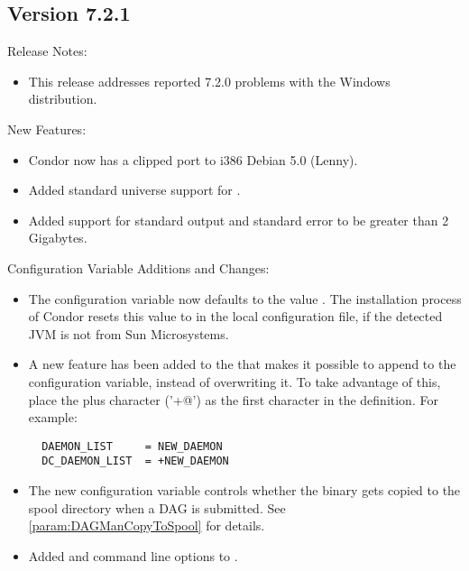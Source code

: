 \subsection*{\label{sec:New-7-2-1}Version 7.2.1}

\noindent Release Notes:

\begin{itemize}

\item This release addresses reported 7.2.0 problems with the
Windows distribution.

\end{itemize}


\noindent New Features:

\begin{itemize}

\item Condor now has a clipped port to i386 Debian 5.0 (Lenny).

\item Added standard universe support for .

\item Added support for standard output and standard error to be greater
than 2 Gigabytes.

\end{itemize}

\noindent Configuration Variable Additions and Changes:

\begin{itemize}

\item The configuration variable  now
defaults to the value .  The installation process of
Condor resets this value to  in the local
configuration file, if the detected JVM is not from Sun Microsystems.

\item A new feature has been added to the  that makes
it possible to append to the  configuration
variable, instead of overwriting it.  To take advantage of this, place
the plus character ('\verb@+@') as the first character in the
 definition.  For example:
\begin{verbatim}
  DAEMON_LIST     = NEW_DAEMON
  DC_DAEMON_LIST  = +NEW_DAEMON
\end{verbatim}

\item The new configuration variable 
controls whether the  binary gets copied to the spool
directory when a DAG is submitted.  See \ref{param:DAGManCopyToSpool}
for details.

\item Added  and  command line options to
.

\end{itemize}

